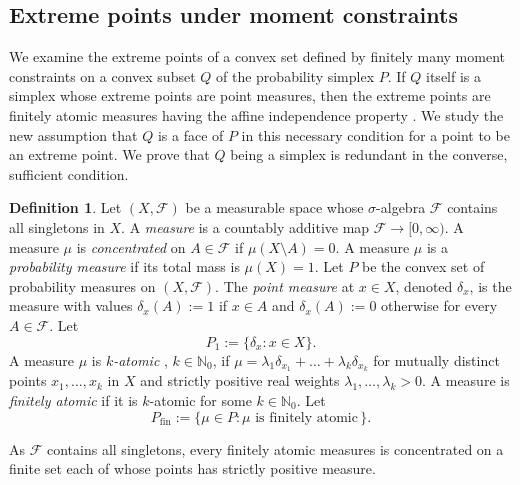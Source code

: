 \documentclass[a4paper,11pt,reqno]{amsart}
\numberwithin{equation}{section}
\theoremstyle{plain}
\theoremstyle{definition}
\newtheorem{definition}[theorem]{Definition}
\newcommand{\cF}{\mathcal{F}} %
\newcommand{\N}{\mathbb{N}} %
\newcommand\fint{\mathrm{fin}}
\begin{document}
\subsection{Extreme points under moment constraints}
\label{sec:ex-moment}
%
We examine the extreme points of a convex set defined by finitely many moment 
constraints on a convex subset $Q$ of the probability simplex $P$. If $Q$ itself
is a simplex whose extreme points are point measures, then the extreme points are 
finitely atomic measures having the affine independence property 
\cite{weizsaecker-winkler80,winkler88}. We study the new assumption that $Q$ is 
a face of $P$ in this necessary condition for a point to be an extreme point. We 
prove that $Q$ being a simplex is redundant in the converse, sufficient condition.  
\par
%
\begin{definition}
Let $(X,\cF)$ be a measurable space whose $\sigma$-algebra $\cF$ contains all 
singletons in $X$. A \emph{measure} is a countably additive map $\cF\to[0,\infty)$. 
A measure $\mu$ is \emph{concentrated} on $A\in\cF$ if $\mu(X\setminus A)=0$.
A measure $\mu$ is a \emph{probability measure} if its total mass is $\mu(X)=1$. 
Let $P$ be the convex set of probability measures on $(X,\cF)$. The 
\emph{point measure} at $x\in X$, denoted $\delta_x$, is the measure with values 
$\delta_x(A):=1$ if $x\in A$ and $\delta_x(A):=0$ otherwise for every $A\in\cF$. 
Let 
\[
P_1:=\{\delta_x: x\in X\}.
\]
A measure $\mu$ is \emph{$k$-atomic} \cite{klerk-laurent19,lasserre10,nie23,schmuedgen17}, 
$k\in\N_0$, if $\mu=\lambda_1\delta_{x_1}+\dots+\lambda_k\delta_{x_k}$ for mutually 
distinct points $x_1,\dots,x_k$ in $X$ and strictly positive real weights 
$\lambda_1,\dots,\lambda_k>0$. A measure is \emph{finitely atomic} if it is $k$-atomic 
for some $k\in\N_0$. Let
\[
P\!_\fint:=
\{\mu\in P : \text{$\mu$ is finitely atomic}\,\}.
\]
\end{definition}
%
As $\cF$ contains all singletons, every finitely atomic measures is concentrated on a 
finite set each of whose points has strictly positive measure.
\par
%
\end{document}
